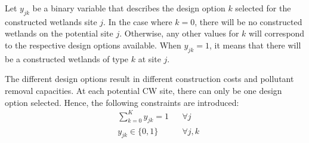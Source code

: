 \documentclass[preprint,12pt,authoryear]{elsarticle}
\begin{document}
Let $y_{jk}$ be a binary variable that describes the design option $k$ selected for the constructed wetlands site $j$. In the case where $k=0$, there will be no constructed wetlands on the potential site $j$. Otherwise, any other values for $k$ will correspond to the respective design options available. When $y_{jk} = 1$, it means that there will be a constructed wetlands of type $k$ at site $j$. 

The different design options result in different construction costs and pollutant removal capacities. At each potential CW site, there can only be one design option selected. Hence, the following constraints are introduced:
\begin{align}
	&\sum_{k=0}^{K}y_{jk}=1&&\forall j\\
	&y_{jk}\in\{0,1\}&&\forall j,k
\end{align}
 
\end{document}
